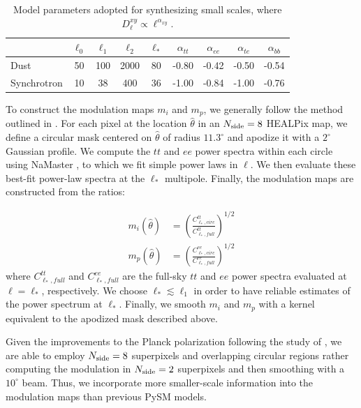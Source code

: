 \documentclass[twocolumn]{aastex631}
\begin{document}
\begin{table}
    \centering
    \footnotesize
    \begin{tabular}{lcccccccc}
    \toprule 
   & $\ell_0$ &   $ \ell_1  $&$\ell_2$   &$\ell_* $& $\alpha_{tt}$  & $\alpha_{ee}$ &$\alpha_{te}$ &$\alpha_{bb}$ \\
   \midrule  
   Dust & 50 & 100 & 2000 & 80 & -0.80 & -0.42& -0.50 & -0.54 \\ 
   Synchrotron & 10 & 38 & 400 & 36 & -1.00& -0.84 & -1.00 & -0.76 \\
   \bottomrule
    \end{tabular}
    \caption{Model parameters adopted for synthesizing small scales, where $D_{\ell}^{xy} \propto \ell^{\alpha_{xy}}$.}
    \label{tab:smallscale_par}
\end{table}

To construct the modulation maps $m_i$ and $m_p$, we generally follow the method outlined in \citet{Thorne:2017}. For each pixel at the location $\hat{\theta}$ in an $N_{\rm side} = 8$ HEALPix map, we define a circular mask centered on $\hat{\theta}$ of radius $11.3^\circ$  and apodize it with a $2^\circ$ Gaussian profile. We compute the $tt$ and $ee$ power spectra within each circle using NaMaster \citep{Alonso:2019}, to which we fit simple power laws in $\ell$. We then evaluate these best-fit power-law spectra at the $\ell_*$ multipole. Finally, the modulation maps are constructed from the ratios:

\begin{align}
\label{eq:mod_maps}
    m_i\left(\hat{\theta}\right) &= \left(\frac{C^{tt}_{\ell_*,circ}}{C^{tt}_{\ell_*,full}}\right)^{1/2} \\
    m_p\left(\hat{\theta}\right) &= \left(\frac{C^{ee}_{\ell_*,circ}}{C^{ee}_{\ell_*,full}}\right)^{1/2} \label{eq:mod_maps2}
\end{align}
where $C^{tt}_{\ell_*,full}$ and $C^{ee}_{\ell_*,full}$ are the full-sky $tt$ and $ee$ power spectra evaluated at $\ell = \ell_*$, respectively. We choose $\ell_* \lesssim \ell_1$ in order to have reliable estimates of the power spectrum at $\ell_*$. Finally, we smooth $m_i$ and $m_p$ with a kernel equivalent to the apodized mask described above. %

Given the improvements to the Planck polarization following the study of \citet{Thorne:2017} \citep[see discussion in][]{planck2016-l01}, we are able to employ $N_{\rm side} = 8$ superpixels and overlapping circular regions rather computing the modulation in $N_{\rm side} = 2$ superpixels and then smoothing with a $10^\circ$ beam. Thus, we incorporate more smaller-scale information into the modulation maps than previous PySM models. 
\end{document}
